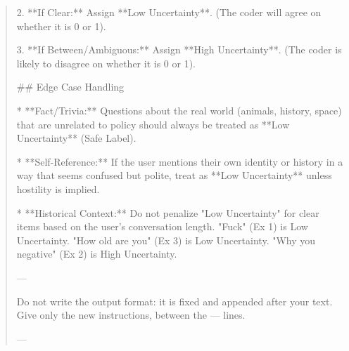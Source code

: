 \begin{quote}
2.  **If Clear:** Assign **Low Uncertainty**. (The coder will agree on whether it is 0 or 1).

3.  **If Between/Ambiguous:** Assign **High Uncertainty**. (The coder is likely to disagree on whether it is 0 or 1).



## Edge Case Handling

*   **Fact/Trivia:** Questions about the real world (animals, history, space) that are unrelated to policy should always be treated as **Low Uncertainty** (Safe Label).

*   **Self-Reference:** If the user mentions their own identity or history in a way that seems confused but polite, treat as **Low Uncertainty** unless hostility is implied.

*   **Historical Context:** Do not penalize "Low Uncertainty" for clear items based on the user's conversation length. "Fuck" (Ex 1) is Low Uncertainty. "How old are you" (Ex 3) is Low Uncertainty. "Why you negative" (Ex 2) is High Uncertainty.



---

Do not write the output format: it is fixed and appended after your text. Give only the new instructions, between the --- lines.

---
\end{quote}
